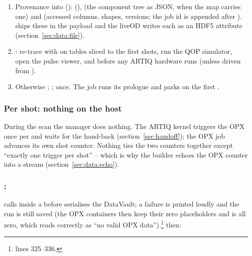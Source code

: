 \begin{enumerate}[nosep]
    drops the config section without qm's capabilities).
  \item Provenance into 
    (): 
    (),  (the
    component tree as JSON, when the map carries one) and
     (accessed columns, shapes, versions; the job id
    is appended after ).  ships these in the
     payload and the liveOD  writes each as an
    HDF5 attribute (section~\ref{sec:data:file}).
  \item {}: re-trace with  on
    tables sliced to the first  shots, run the QOP
    simulator, open the pulse viewer, and  before any ARTIQ
    hardware runs (unless driven from ).
  \item Otherwise ; ;  once. The
    job runs its prologue and parks on the first .
\end{enumerate}

\subsubsection{Per shot: nothing on the host}

During the scan the manager does nothing. The ARTIQ kernel triggers the OPX
once per  and waits for the hand-back
(section~\ref{sec:handoff}); the OPX job advances its own shot counter.
Nothing ties the two counters together except ``exactly one trigger per
shot'' -- which is why the builder echoes the OPX counter into a stream
(section~\ref{sec:data:echo}).

\subsubsection{: }

 calls  inside a  before
 serialises the DataVault; a failure is printed loudly and the
run is still saved (the OPX containers then keep their zero placeholders and
 is all zero, which reads correctly as ``no valid OPX
data'').\footnote{ lines 325--336.}
 then:

